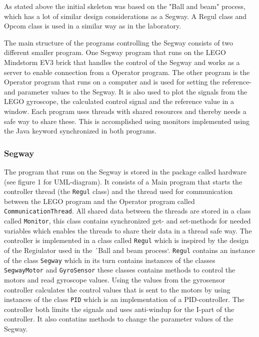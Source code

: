 As stated above the initial skeleton was based on the "Ball and beam" process, which has a lot of similar design considerations as a Segway. A Regul class and Opcom class is used in a similar way as in the laboratory.

The main structure of the programs controlling the Segway consists of two different smaller program. One Segway program that runs on the LEGO Mindstorm EV3 brick that handles the control of the Segway and works as a server to enable connection from a Operator program. The other program is the Operator program that runs on a computer and is used for setting the reference- and parameter values to the Segway. It is also used to plot the signals from the LEGO gyroscope, the calculated control signal and the reference value in a window. Each program uses threads with shared resources and thereby needs a safe way to share these. This is accomplished using monitors implemented using the Java keyword synchronized in both programs.


\subsubsection{Segway}
The program that runs on the Segway is stored in the package called hardware (see figure 1 for UML-diagram). It consists of a Main program that starts the controller thread (the \texttt{Regul} class) and the thread used for communication between the LEGO program and the Operator program called \texttt{CommunicationThread}. All shared data between the threads are stored in a class called \texttt{Monitor}, this class contains synchronized get- and set-methods for needed variables which enables the threads to share their data in a thread safe way. The controller is implemented in a class called \texttt{Regul} which is inspired by the design of the Regiulator used in the ´Ball and beam process`. \texttt{Regul} contains an instance of the class \texttt{Segway} which in its turn contains instances of the classes \texttt{SegwayMotor} and \texttt{GyroSensor} these classes contains methods to control the motors and read gyroscope values. Using the values from the gyrosensor controller calculates the control values that is sent to the motors by using instances of the class \texttt{PID} which is an implementation of a PID-controller. The controller both limits the signals and uses anti-windup for the I-part of the controller. It also contatins methods to change the parameter values of the Segway.


